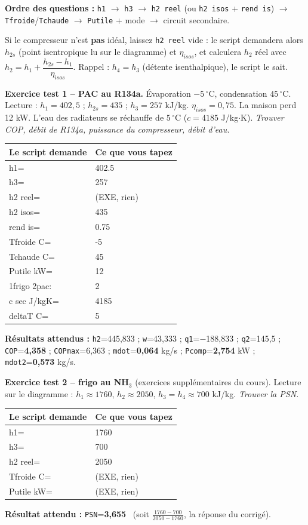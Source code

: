 \documentclass[10.5pt,a4paper]{article}
\makeatletter
\newenvironment{saisie}{%
\begin{center}\small
\begin{tabular}{@{}>{\ttfamily}l l@{}}
\toprule
\textrm{\textbf{Le script demande}} & \textbf{Ce que vous tapez} \\
\midrule
}{%
\bottomrule
\end{tabular}
\end{center}
}
\makeatother
\begin{document}
\textbf{Ordre des questions :} \texttt{h1} $\rightarrow$ \texttt{h3} $\rightarrow$ \texttt{h2 reel}
(ou \texttt{h2 isos} + \texttt{rend is}) $\rightarrow$ \texttt{Tfroide}/\texttt{Tchaude} $\rightarrow$
\texttt{Putile} + mode $\rightarrow$ circuit secondaire.

\begin{piege}
Si le compresseur n'est \textbf{pas} idéal, laissez \texttt{h2 reel} vide : le script demandera alors
$h_{2s}$ (point isentropique lu sur le diagramme) et $\eta_{isos}$, et calculera $h_2$ réel avec
$h_2=h_1+\dfrac{h_{2s}-h_1}{\eta_{isos}}$. Rappel : $h_4=h_3$ (détente isenthalpique), le script le sait.
\end{piege}

\begin{test}
\textbf{Exercice test 1 -- PAC au R134a.} Évaporation $-5\,^\circ$C, condensation $45\,^\circ$C.
Lecture : $h_1=402{,}5$ ; $h_{2s}=435$ ; $h_3=257$ kJ/kg. $\eta_{isos}=0{,}75$. La maison perd 12 kW.
L'eau des radiateurs se réchauffe de $5\,^\circ$C ($c=4185$ J/kg$\cdot$K).
\emph{Trouver COP, débit de R134a, puissance du compresseur, débit d'eau.}

\begin{saisie}
h1= & 402.5 \\
h3= & 257 \\
h2 reel= & \textrm{(EXE, rien)} \\
h2 isos= & 435 \\
rend is= & 0.75 \\
Tfroide C= & -5 \\
Tchaude C= & 45 \\
Putile kW= & 12 \\
1frigo 2pac: & 2 \\
c sec J/kgK= & 4185 \\
deltaT C= & 5 \\
\end{saisie}

\textbf{Résultats attendus :} \texttt{h2}=445,833 ; \texttt{w}=43,333 ; \texttt{q1}=$-$188,833 ;
\texttt{q2}=145,5 ; \texttt{COP}=\textbf{4,358} ; \texttt{COPmax}=6,363 ;
\texttt{mdot}=\textbf{0,064} kg/s ; \texttt{Pcomp}=\textbf{2,754} kW ; \texttt{mdot2}=\textbf{0,573} kg/s.
\end{test}

\begin{test}
\textbf{Exercice test 2 -- frigo au NH$_3$} (exercices supplémentaires du cours). Lecture sur le
diagramme : $h_1\approx1760$, $h_2\approx2050$, $h_3=h_4\approx700$ kJ/kg. \emph{Trouver la PSN.}

\begin{saisie}
h1= & 1760 \\
h3= & 700 \\
h2 reel= & 2050 \\
Tfroide C= & \textrm{(EXE, rien)} \\
Putile kW= & \textrm{(EXE, rien)} \\
\end{saisie}

\textbf{Résultat attendu :} \texttt{PSN}=\textbf{3,655} \ (soit $\frac{1760-700}{2050-1760}$, la réponse
du corrigé).
\end{test}
\end{document}

